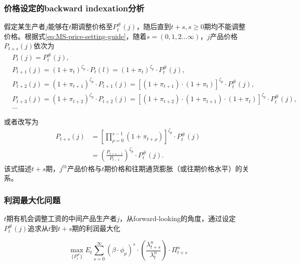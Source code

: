 \subsubsection{价格设定的backward indexation分析}
假定某生产者$j$能够在$t$期调整价格至$P_t^{\#}(j)$，随后直到$t+s, s\ge 0$期均不能调整价格。根据式\eqref{eq:MS-price-setting-guide}，随着$s=(0,1,2 \ldots \infty )$，$j$产品价格$P_{t+s}(j)$依次为
\begin{align*}
&P_t(j) = P_t^{\#}(j), \\
&P_{t+1}(j) = (1+\pi_t)^{\zeta_p} \cdot P_{t}(l) =  (1+\pi_t)^{\zeta_p} \cdot P_{t}^{\#}(j), \\
&P_{t+2}(j) = (1+\pi_{t+1})^{\zeta_p} \cdot P_{t+1}(j)
= \left[
\left(1+\pi_{t+1}\right) \cdot \left(1 + \pi_t \right)
\right]^{\zeta_p} \cdot P_{t}^{\#}(j),\\
&P_{t+3}(j) = (1+\pi_{t+2})^{\zeta_p} \cdot P_{t+2}(j)
= \left[
\left(1+\pi_{t+2}\right) \cdot \left(1+\pi_{t+1}\right) \cdot \left(1 + \pi_t \right)
\right]^{\zeta_p} \cdot P_{t}^{\#}(j),\\
& \ldots
\end{align*}

或者改写为
\begin{equation}
\label{eq:MS-updating-price-recursion}
\begin{split}
P_{t+s}(j) &= \left[\prod_{\rho=0}^{s-1} \left(1+\pi_{t+\rho}\right)\right]^{\zeta_p} \cdot P_t^{\#}(j) \\
&=\left(\frac{P_{t+s-1}}{P_{t-1}}\right)^{\zeta_p} \cdot P_t^{\#}(j).
\end{split}
\end{equation}
该式描述$t+s$期，$j^{th}$产品价格与$t$期价格和往期通货膨胀（或往期价格水平）的关系。

\subsubsection{利润最大化问题}
$t$期有机会调整工资的中间产品生产者$j$，从forward-looking的角度，通过设定$P^{\#}_t(j)$追求从$t$到$t+s$期的利润最大化

\begin{equation}
\label{eq:MS-intm-prof-max-Pi}
\max_{\{P_t^{\#}\}} E_t \sum_{s=0}^{\infty} \left(\beta \cdot \phi_p \right)^s \cdot \left(\frac{\lambda^{n}_{t+s}}{\lambda^{n}_{t}}\right) \cdot \Pi_{t+s}^n
\end{equation}

